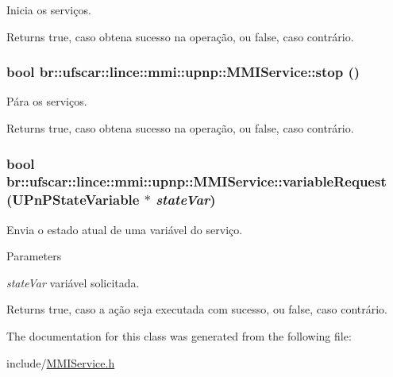 Inicia os serviços. 

\begin{DoxyReturn}{Returns}
true, caso obtena sucesso na operação, ou false, caso contrário. 
\end{DoxyReturn}
\hypertarget{classbr_1_1ufscar_1_1lince_1_1mmi_1_1upnp_1_1MMIService_a0687c9dbf5bbbaa2b490e19bb88a1a51}{
\subsubsection[{stop}]{\setlength{\rightskip}{0pt plus 5cm}bool br::ufscar::lince::mmi::upnp::MMIService::stop ()}}
\label{classbr_1_1ufscar_1_1lince_1_1mmi_1_1upnp_1_1MMIService_a0687c9dbf5bbbaa2b490e19bb88a1a51}


Pára os serviços. 

\begin{DoxyReturn}{Returns}
true, caso obtena sucesso na operação, ou false, caso contrário. 
\end{DoxyReturn}
\hypertarget{classbr_1_1ufscar_1_1lince_1_1mmi_1_1upnp_1_1MMIService_a1e6559d7dbe7372d8f60e451ac157935}{
\subsubsection[{variableRequest}]{\setlength{\rightskip}{0pt plus 5cm}bool br::ufscar::lince::mmi::upnp::MMIService::variableRequest (UPnPStateVariable $\ast$ {\em stateVar})}}
\label{classbr_1_1ufscar_1_1lince_1_1mmi_1_1upnp_1_1MMIService_a1e6559d7dbe7372d8f60e451ac157935}


Envia o estado atual de uma variável do serviço. 


\begin{DoxyParams}{Parameters}
\item[{\em stateVar}]variável solicitada. \end{DoxyParams}
\begin{DoxyReturn}{Returns}
true, caso a ação seja executada com sucesso, ou false, caso contrário. 
\end{DoxyReturn}


The documentation for this class was generated from the following file:\begin{DoxyCompactItemize}
\item 
include/\hyperlink{MMIService_8h}{MMIService.h}\end{DoxyCompactItemize}
